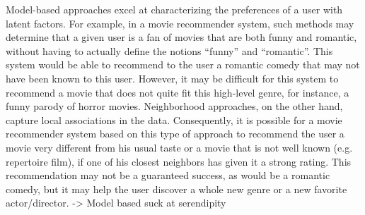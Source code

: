 Model-based approaches excel at characterizing the preferences of a user with latent factors. For example, in a movie recommender system, such methods may determine that a given user is a fan of movies that are both funny and romantic, without having to actually define the notions “funny” and “romantic”. This system would be able to recommend to the user a romantic comedy that may not have been known to this user. However, it may be difficult for this system to recommend a movie that does not quite fit this high-level genre, for instance, a funny parody of horror movies. Neighborhood approaches, on the other hand, capture local associations in the data. Consequently, it is possible for a movie recommender system based on this type of approach to recommend the user a movie very different from his usual taste or a movie that is not well known (e.g. repertoire film), if one of his closest neighbors has given it a strong rating. This recommendation may not be a guaranteed success, as would be a romantic comedy, but it may help the user discover a whole new genre or a new favorite actor/director. -> Model based suck at serendipity

